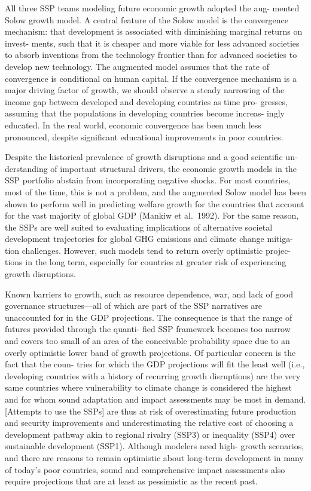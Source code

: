 \documentclass[
]{book}
\begin{document}
All three SSP teams modeling future economic growth adopted the aug-
mented Solow growth model.
A central feature of the Solow model is the convergence mechanism:
that development is associated with diminishing marginal returns on invest-
ments, such that it is cheaper and more viable for less advanced societies to
absorb inventions from the technology frontier than for advanced societies to
develop new technology. The augmented model assumes that the rate of
convergence is conditional on human capital. If the convergence mechanism
is a major driving factor of growth, we should observe a steady narrowing of
the income gap between developed and developing countries as time pro-
gresses, assuming that the populations in developing countries become increas-
ingly educated.
In the real world, economic convergence has been much less pronounced,
despite signiﬁcant educational improvements in poor countries.

Despite the historical prevalence of growth disruptions and a good scientiﬁc un-
derstanding of important structural drivers, the economic growth models in the
SSP portfolio abstain from incorporating negative shocks.
For most countries,
most of the time, this is not a problem, and the augmented Solow model has
been shown to perform well in predicting welfare growth for the countries that
account for the vast majority of global GDP (Mankiw et al.~1992). For the same
reason, the SSPs are well suited to evaluating implications of alternative societal
development trajectories for global GHG emissions and climate change mitiga-
tion challenges. However, such models tend to return overly optimistic projec-
tions in the long term, especially for countries at greater risk of experiencing
growth disruptions.

Known barriers to growth, such as resource dependence, war, and lack
of good governance structures---all of which are part of the SSP narratives
are unaccounted for in the GDP projections.
The consequence is that the range of futures provided through the quanti-
ﬁed SSP framework becomes too narrow
and covers too
small of an area of the conceivable probability space due to an overly optimistic
lower band of growth projections. Of particular concern is the fact that the coun-
tries for which the GDP projections will ﬁt the least well (i.e., developing countries
with a history of recurring growth disruptions) are the very same countries where
vulnerability to climate change is considered the highest and for whom sound
adaptation and impact assessments may be most in demand.
{[}Attempts to use the SSPs{]} are thus at risk of overestimating future production and security
improvements and underestimating the relative cost of
choosing a development pathway akin to regional rivalry (SSP3) or inequality
(SSP4) over sustainable development (SSP1). Although modelers need high-
growth scenarios, and there are reasons to remain optimistic about long-term
development in many of today's poor countries, sound and comprehensive
impact assessments also require projections that are at least as pessimistic as
the recent past.
\end{document}
